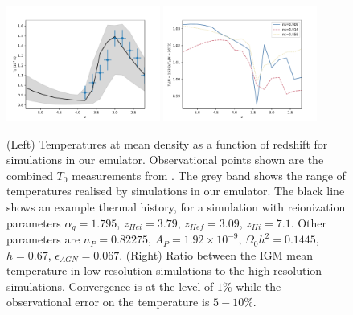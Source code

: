 \documentclass[a4paper,11pt]{article}
\begin{document}
\begin{figure}
\includegraphics[width=0.45\textwidth]{figures/mean-temperature.pdf}
\includegraphics[width=0.45\textwidth]{figures/mean-temperature-resolution.pdf}
 \caption{(Left) Temperatures at mean density as a function of redshift for simulations in our emulator. Observational points shown are the combined $T_0$ measurements from \protect\cite{Gaikwad:2021}.  The grey band shows the range of temperatures realised by simulations in our emulator. The black line shows an example thermal history, for a simulation with reionization parameters $\alpha_q = 1.795$, $z_{Hei} = 3.79$, $z_{Hef} = 3.09$, $z_{Hi} = 7.1$. Other parameters are $n_P = 0.82275$, $A_P = 1.92 \times 10^{-9}$, $\Omega_0 h^2 = 0.1445$, $h = 0.67$, $\epsilon_{AGN} = 0.067$.
 (Right) Ratio between the IGM mean temperature in low resolution simulations to the high resolution simulations. Convergence is at the level of $1\%$ while the observational error on the temperature is $5-10\%$.
}
 \label{fig:meanigmtempdens}
\end{figure}
\end{document}
